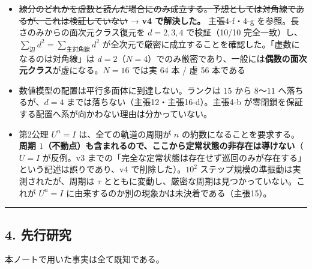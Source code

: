 \documentclass[
  10pt,
]{ltjsarticle}
\providecommand{\tightlist}{%
  \setlength{\itemsep}{0pt}\setlength{\parskip}{0pt}}
\begin{document}
\begin{itemize}
\tightlist
\item
  \st{線分のどれかを虚数と読んだ場合にのみ成立する。予想としては対角線であるが、これは検証していない}
  → \textbf{v4 で解決した。} 主張4-f・4-g
  を参照。長さのみからの面次元クラス復元を \(d=2,3,4\) で検証（10/10
  完全一致）し、\(\sum_{辺}d^2 = \sum_{主対角線}d^2\)
  が全次元で厳密に成立することを確認した。「虚数になるのは対角線」は
  \(d=2\)（\(N=4\)）でのみ厳密であり、一般には\textbf{偶数の面次元クラス}が虚になる。\(N=16\)
  では実 64 本 / 虚 56 本である
\item
  数値模型の配置は平行多面体に到達しない。ランクは \(15\) から
  \(8\)〜\(11\) へ落ちるが、\(d = 4\)
  までは落ちない（主張12・主張16-d）。主張4-b
  が零閉鎖を保証する配置へ系が向かわない理由は分かっていない。
\item
  第2公理 \(U^n = I\) は、全ての軌道の周期が \(n\)
  の約数になることを要求する。\textbf{周期
  \(1\)（不動点）も含まれるので、ここから定常状態の非存在は導けない}（\(U=I\)
  が反例。v3
  までの「完全な定常状態は存在せず巡回のみが存在する」という記述は誤りであり、v4
  で削除した）。\(10^2\) ステップ規模の準振動は実測されたが、周期は
  \(\tau\) とともに変動し、厳密な周期は見つかっていない。これが
  \(U^n = I\) に由来するのか別の現象かは未決着である（主張15）。
\end{itemize}

\begin{center}\rule{0.5\linewidth}{0.5pt}\end{center}

\subsection{4. 先行研究}\label{ux5148ux884cux7814ux7a76}

本ノートで用いた事実は全て既知である。
\end{document}
